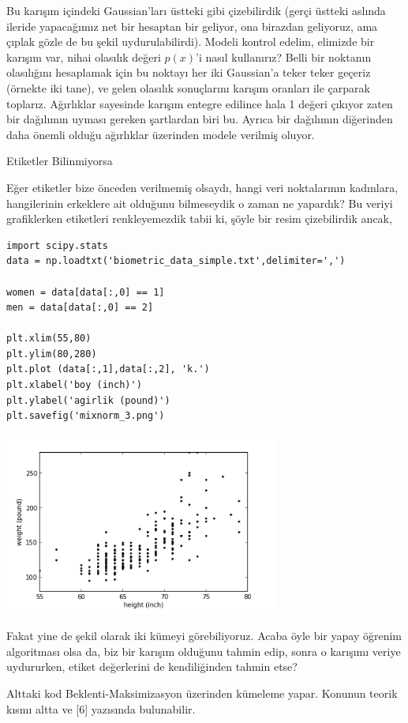 \documentclass[12pt,fleqn]{article}\usepackage{../../common}
\begin{document}
Bu karışım içindeki Gaussian'ları üstteki gibi çizebilirdik (gerçi üstteki
aslında ileride yapacağımız net bir hesaptan bir geliyor, ona birazdan
geliyoruz, ama çıplak gözle de bu şekil uydurulabilirdi). Modeli kontrol
edelim, elimizde bir karışım var, nihai olasılık değeri $p(x)$'i nasıl
kullanırız? Belli bir noktanın olasılığını hesaplamak için bu noktayı her
iki Gaussian'a teker teker geçeriz (örnekte iki tane), ve gelen olasılık
sonuçlarını karışım oranları ile çarparak toplarız.  Ağırlıklar sayesinde
karışım entegre edilince hala 1 değeri çıkıyor zaten bir dağılımın uyması
gereken şartlardan biri bu. Ayrıca bir dağılımın diğerinden daha önemli
olduğu ağırlıklar üzerinden modele verilmiş oluyor. 

Etiketler Bilinmiyorsa

Eğer etiketler bize önceden verilmemiş olsaydı, hangi veri noktalarının
kadınlara, hangilerinin erkeklere ait olduğunu bilmeseydik o zaman ne
yapardık? Bu veriyi grafiklerken etiketleri renkleyemezdik tabii ki, şöyle
bir resim çizebilirdik ancak,

\begin{verbatim}
import scipy.stats
data = np.loadtxt('biometric_data_simple.txt',delimiter=',')

women = data[data[:,0] == 1]
men = data[data[:,0] == 2]

plt.xlim(55,80)
plt.ylim(80,280)
plt.plot (data[:,1],data[:,2], 'k.')
plt.xlabel('boy (inch)')
plt.ylabel('agirlik (pound)')
plt.savefig('mixnorm_3.png')
\end{verbatim}

\includegraphics[height=6cm]{mixnorm_3.png}

Fakat yine de şekil olarak iki kümeyi görebiliyoruz.  Acaba öyle bir yapay
öğrenim algoritması olsa da, biz bir karışım olduğunu tahmin edip, sonra o
karışımı veriye uydururken, etiket değerlerini de kendiliğinden tahmin
etse?

Alttaki kod Beklenti-Maksimizasyon üzerinden kümeleme yapar. Konunun teorik
kısmı altta ve [6] yazısında bulunabilir.
\end{document}
